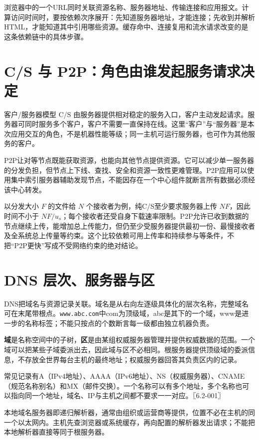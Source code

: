 浏览器中的一个URL同时关联资源名称、服务器地址、传输连接和应用报文。计算访问时间时，要按依赖次序展开：先知道服务器地址，才能连接；先收到并解析HTML，才能知道其中引用哪些资源。缓存命中、连接复用和流水请求改变的是这条依赖链中的具体步骤。

\section{C/S 与 P2P：角色由谁发起服务请求决定}\label{cn-06-01}

客户/服务器模型 C/S 由服务器提供相对稳定的服务入口，客户主动发起请求。服务器可同时服务多个客户，客户不需要一直保持在线。这里``客户''与``服务器''是本次应用交互的角色，不是机器性能等级；同一主机可运行服务器，也可作为其他服务的客户。

P2P让对等节点既能获取资源，也能向其他节点提供资源。它可以减少单一服务器的分发负担，但节点上下线、查找、安全和资源一致性更难管理。P2P应用可以使用集中索引服务器辅助发现节点，不能因存在一个中心组件就断言所有数据必须经该中心转发。

以分发大小 \(F\) 的文件给 \(N\) 个接收者为例，纯C/S至少要求服务器上传 \(NF\)，因此时间不小于 \(NF/u_s\)；每个接收者还受自身下载速率限制。P2P允许已收到数据的节点继续上传，能增加总上传能力，但仍至少受服务器提供最初一份、最慢接收者及全系统总上传量等约束。这个比较依赖可用上传率和持续参与等条件，不把``P2P更快''写成不受网络约束的绝对结论。

\section{DNS 层次、服务器与区}\label{cn-06-02}

DNS把域名与资源记录关联。域名是从右向左逐级具体化的层次名称，完整域名可在末尾带根点。\texttt{www.abc.com}中com为顶级域，abc是其下的一个域，www是进一步的名称标签；不能只按点的个数断言每一级都由独立机器负责。

\textbf{域}是名称空间中的子树，\textbf{区}是由某组权威服务器管理并提供权威数据的范围。一个域可以把某些子域委派出去，因此域与区不必相同。根服务器提供顶级域的委派信息，不存放全世界每台主机的最终地址；权威服务器回答其负责区内的记录。

常见记录有A（IPv4地址）、AAAA（IPv6地址）、NS（权威服务器）、CNAME（规范名称别名）和MX（邮件交换）。一个名称可以有多个地址，多个名称也可以指向同一个地址，域名、IP与主机之间都不要求一一对应。〖6.2-001〗

本地域名服务器即递归解析器，通常由组织或运营商等提供，位置不必在主机的同一个以太网内。主机先查浏览器或系统缓存，再向配置的解析器发出请求；不能把本地解析器直接等同于根服务器。


